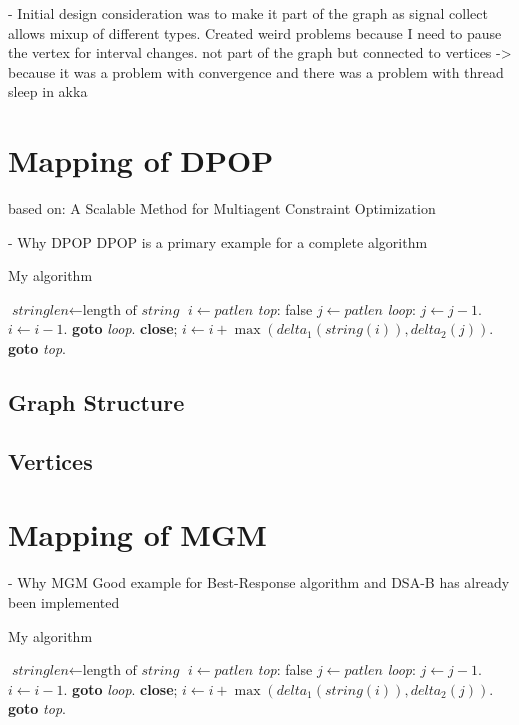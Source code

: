 - Initial design consideration was to make it part of the graph as signal collect allows mixup of different types. Created weird problems because I need to pause the vertex for interval changes. not part of the graph but connected to vertices -> because it was a problem with convergence and there was a problem with thread sleep in akka

\section{Mapping of DPOP}

based on: A Scalable Method for Multiagent Constraint Optimization
    
    - Why DPOP
    DPOP is a primary example for a complete algorithm
   
    \begin{algorithm}
\caption{My algorithm}\label{euclid}
\begin{algorithmic}[1]
\State $\textit{stringlen} \gets \text{length of }\textit{string}$
\State $i \gets \textit{patlen}$
\BState \emph{top}:
 \Return false
\EndIf
\State $j \gets \textit{patlen}$
\BState \emph{loop}:
\State $j \gets j-1$.
\State $i \gets i-1$.
\State \textbf{goto} \emph{loop}.
\State \textbf{close};
\EndIf
\State $i \gets i+\max(\textit{delta}_1(\textit{string}(i)),\textit{delta}_2(j))$.
\State \textbf{goto} \emph{top}.
\EndProcedure
\end{algorithmic}
\end{algorithm}

\subsection{Graph Structure}
\subsection{Vertices}

\section{Mapping of MGM}

     - Why MGM
     Good example for Best-Response algorithm and DSA-B has already been implemented

    \begin{algorithm}
\caption{My algorithm}\label{euclid}
\begin{algorithmic}[2]
\State $\textit{stringlen} \gets \text{length of }\textit{string}$
\State $i \gets \textit{patlen}$
\BState \emph{top}:
 \Return false
\EndIf
\State $j \gets \textit{patlen}$
\BState \emph{loop}:
\State $j \gets j-1$.
\State $i \gets i-1$.
\State \textbf{goto} \emph{loop}.
\State \textbf{close};
\EndIf
\State $i \gets i+\max(\textit{delta}_1(\textit{string}(i)),\textit{delta}_2(j))$.
\State \textbf{goto} \emph{top}.
\EndProcedure
\end{algorithmic}
\end{algorithm}

